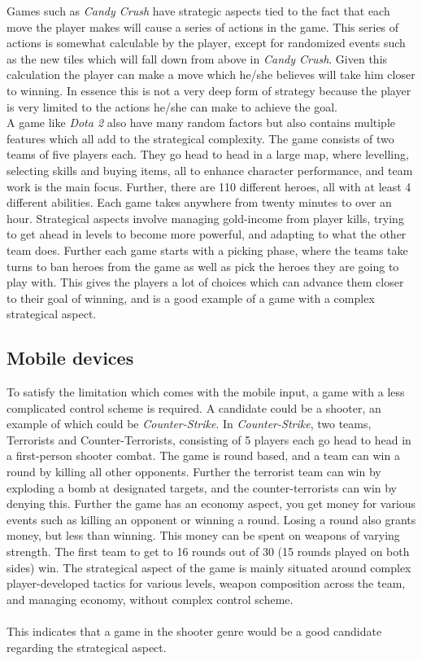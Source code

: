 Games such as \textit{Candy Crush}\cite{candycrush} have strategic aspects tied to the fact that each move the player makes will cause a series of actions in the game.
This series of actions is somewhat calculable by the player, except for randomized events such as the new tiles which will fall down from above in \textit{Candy Crush}.
Given this calculation the player can make a move which he/she believes will take him closer to winning.
In essence this is not a very deep form of strategy because the player is very limited to the actions he/she can make to achieve the goal.\\
A game like \textit{Dota 2}\cite{Dota2} also have many random factors but also contains multiple features which all add to the strategical complexity.
The game consists of two teams of five players each. 
They go head to head in a large map, where levelling, selecting skills and buying items, all to enhance character performance, and team work is the main focus. 
Further, there are 110 different heroes, all with at least 4 different abilities. 
Each game takes anywhere from twenty minutes to over an hour. 
Strategical aspects involve managing gold-income from player kills, trying to get ahead in levels to become more powerful, and adapting to what the other team does. 
Further each game starts with a picking phase, where the teams take turns to ban heroes from the game as well as pick the heroes they are going to play with.
This gives the players a lot of choices which can advance them closer to their goal of winning, and is a good example of a game with a complex strategical aspect.

\subsection{Mobile devices}
To satisfy the limitation which comes with the mobile input, a game with a less complicated control scheme is required.
A candidate could be a shooter, an example of which could be \textit{Counter-Strike}. \cite{counterstrike}
In \textit{Counter-Strike}, two teams, Terrorists and Counter-Terrorists, consisting of 5 players each go head to head in a first-person shooter combat. 
The game is round based, and a team can win a round by killing all other opponents. 
Further the terrorist team can win by exploding a bomb at designated targets, and the counter-terrorists can win by denying this. 
Further the game has an economy aspect, you get money for various events such as killing an opponent or winning a round.
Losing a round also grants money, but less than winning.
This money can be spent on weapons of varying strength.
The first team to get to 16 rounds out of 30 (15 rounds played on both sides) win. 
The strategical aspect of the game is mainly situated around complex player-developed tactics for various levels, weapon composition across the team, and managing economy, without complex control scheme.\\\\
This indicates that a game in the shooter genre would be a good candidate regarding the strategical aspect.